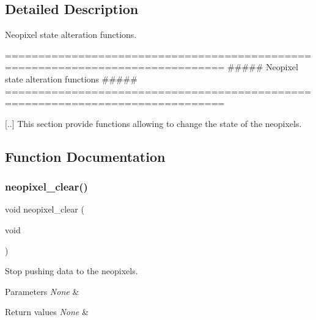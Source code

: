 \subsection{Detailed Description}
Neopixel state alteration functions. 

\begin{DoxyVerb} ===============================================================================
         ##### Neopixel state alteration functions #####
 ===============================================================================

 [..] This section provide functions allowing to change the state of the neopixels.\end{DoxyVerb}
 

\subsection{Function Documentation}
\mbox{\label{group___state_ga8e3cfef785ce221672f825f8785c25b8}} 
\subsubsection{\texorpdfstring{neopixel\+\_\+clear()}{neopixel\_clear()}}
{\footnotesize\ttfamily void neopixel\+\_\+clear (\begin{DoxyParamCaption}\item[{void}]{ }\end{DoxyParamCaption})}



Stop pushing data to the neopixels. 


\begin{DoxyParams}{Parameters}
{\em None} & \\
\hline
\end{DoxyParams}

\begin{DoxyRetVals}{Return values}
{\em None} & \\
\hline
\end{DoxyRetVals}
\mbox{\label{group___state_ga79e34feddcfb2c45ae218166c84bdff4}} 

